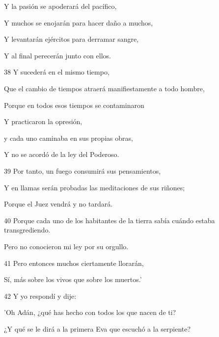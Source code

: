 \par Y la pasión se apoderará del pacífico,

\par Y muchos se enojarán para hacer daño a muchos,

\par Y levantarán ejércitos para derramar sangre,

\par Y al final perecerán junto con ellos.

\par 38 Y sucederá en el mismo tiempo,

\par Que el cambio de tiempos atraerá manifiestamente a todo hombre,

\par Porque en todos esos tiempos se contaminaron

\par Y practicaron la opresión,

\par y cada uno caminaba en sus propias obras,

\par Y no se acordó de la ley del Poderoso.

\par 39 Por tanto, un fuego consumirá sus pensamientos,

\par Y en llamas serán probadas las meditaciones de sus riñones;

\par Porque el Juez vendrá y no tardará.

\par 40 Porque cada uno de los habitantes de la tierra sabía cuándo estaba transgrediendo.

\par Pero no conocieron mi ley por su orgullo.

\par 41 Pero entonces muchos ciertamente llorarán,

\par Sí, más sobre los vivos que sobre los muertos.'

\par 42 Y yo respondí y dije:

\par 'Oh Adán, ¿qué has hecho con todos los que nacen de ti?

\par ¿Y qué se le dirá a la primera Eva que escuchó a la serpiente?

